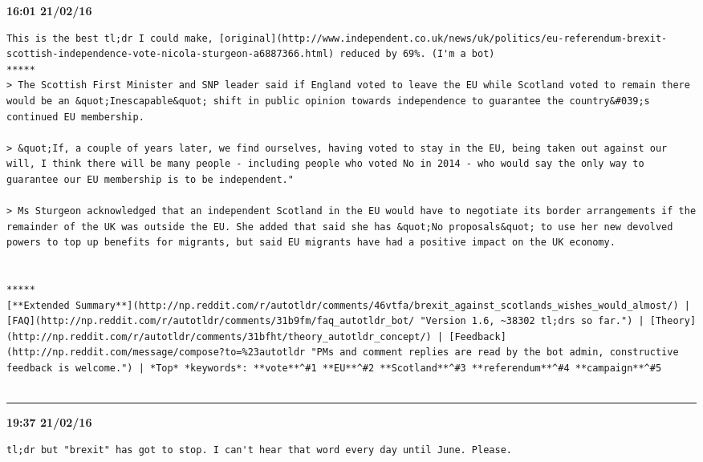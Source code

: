 \begin{adjustwidth}{0cm}{0cm}
\footnotesize \textbf{16:01 21/02/16}

\begin{lstlisting}[breaklines, breakatwhitespace, basicstyle=\small, frame=leftline]
This is the best tl;dr I could make, [original](http://www.independent.co.uk/news/uk/politics/eu-referendum-brexit-scottish-independence-vote-nicola-sturgeon-a6887366.html) reduced by 69%. (I'm a bot)
*****
> The Scottish First Minister and SNP leader said if England voted to leave the EU while Scotland voted to remain there would be an &quot;Inescapable&quot; shift in public opinion towards independence to guarantee the country&#039;s continued EU membership.

> &quot;If, a couple of years later, we find ourselves, having voted to stay in the EU, being taken out against our will, I think there will be many people - including people who voted No in 2014 - who would say the only way to guarantee our EU membership is to be independent."

> Ms Sturgeon acknowledged that an independent Scotland in the EU would have to negotiate its border arrangements if the remainder of the UK was outside the EU. She added that said she has &quot;No proposals&quot; to use her new devolved powers to top up benefits for migrants, but said EU migrants have had a positive impact on the UK economy.


*****
[**Extended Summary**](http://np.reddit.com/r/autotldr/comments/46vtfa/brexit_against_scotlands_wishes_would_almost/) | [FAQ](http://np.reddit.com/r/autotldr/comments/31b9fm/faq_autotldr_bot/ "Version 1.6, ~38302 tl;drs so far.") | [Theory](http://np.reddit.com/r/autotldr/comments/31bfht/theory_autotldr_concept/) | [Feedback](http://np.reddit.com/message/compose?to=%23autotldr "PMs and comment replies are read by the bot admin, constructive feedback is welcome.") | *Top* *keywords*: **vote**^#1 **EU**^#2 **Scotland**^#3 **referendum**^#4 **campaign**^#5


\end{lstlisting}
\end{adjustwidth}

\hrule%

\begin{adjustwidth}{0cm}{0cm}
\footnotesize \textbf{19:37 21/02/16}

\begin{lstlisting}[breaklines, breakatwhitespace, basicstyle=\small, frame=leftline]
tl;dr but "brexit" has got to stop. I can't hear that word every day until June. Please. 
\end{lstlisting}
\end{adjustwidth}

